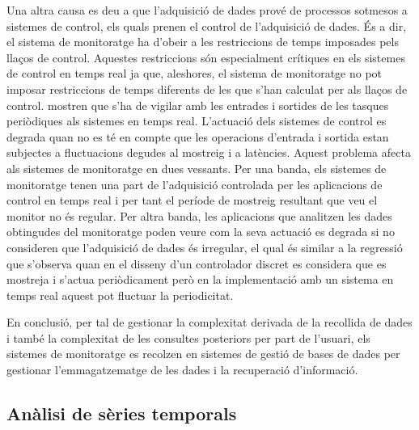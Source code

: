 \begin{enumerate}
Una altra causa es deu a que l'adquisició de dades prové de processos sotmesos a sistemes de control, els quals prenen el control de l'adquisició de dades. És a dir, el sistema de monitoratge ha d'obeir a les restriccions de temps imposades pels llaços de control. Aquestes restriccions són especialment crítiques en els sistemes de control en temps real ja que, aleshores, el sistema de monitoratge no pot imposar restriccions de temps diferents de les que s'han calculat per als llaços de control.  \textcite{lozoya08} mostren que s'ha de vigilar amb les entrades i sortides de les tasques periòdiques als sistemes en temps real. L'actuació dels sistemes de control es degrada quan no es té en compte que les operacions d'entrada i sortida estan subjectes a fluctuacions degudes al mostreig i a latències. Aquest problema afecta als sistemes de monitoratge en dues vessants.
Per una banda, els sistemes de monitoratge tenen una part de l'adquisició controlada per les aplicacions de control en temps real i per tant el període de mostreig resultant que veu el monitor no és regular. 
Per altra banda, les aplicacions que analitzen les dades obtingudes del monitoratge poden veure com la seva actuació es degrada si no consideren que l'adquisició de dades és irregular, el qual és similar a la regressió que s'observa \parencite{lozoya08} quan en el disseny d'un controlador discret es considera que es mostreja i s'actua periòdicament però en la implementació amb un sistema en temps real aquest pot fluctuar la periodicitat.

\end{enumerate}



En conclusió, per tal de gestionar la complexitat derivada de la recollida de dades i també la complexitat de les consultes posteriors per part de l'usuari, els sistemes de monitoratge es recolzen en sistemes de gestió de bases de dades per gestionar l'emmagatzematge de les dades i la recuperació d'informació.





\subsection{Anàlisi de sèries temporals}


